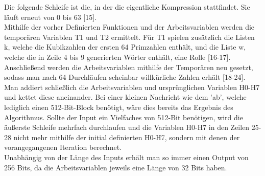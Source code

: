 Die folgende Schleife ist die, in der die eigentliche Kompression stattfindet. Sie läuft erneut von 0 bis 63 [15].\\
Mithilfe der vorher Definierten Funktionen und der Arbeitsvariablen werden die temporären Variablen T1 und T2 ermittelt. 
Für T1 spielen zusätzlich die Listen k, welche die Kubikzahlen der ersten 64 Primzahlen enthält, und die Liste w, welche die in Zeile 4 bis 9 generierten Wörter enthält, eine Rolle [16-17].\\
Anschließend werden die Arbeitsvariablen mithilfe der Temporären neu gesetzt, sodass man nach 64 Durchläufen scheinbar willkürliche Zahlen erhält [18-24].\\
Man addiert schließlich die Arbeitsvariablen und ursprünglichen Variablen H0-H7 und kettet diese aneinander. Bei einer kleinen Nachricht wie dem 'ab', welche lediglich einen 512-Bit-Block benötigt, wäre dies bereits das Ergebnis des Algorithmus. Sollte der Input ein Vielfaches von 512-Bit benötigen, wird die äußerste Schleife mehrfach durchlaufen und die Variablen H0-H7 in den Zeilen 25-28 nicht mehr mithilfe der initial definierten H0-H7, sondern mit denen der vorangegangenen Iteration berechnet.\\
Unabhängig von der Länge des Inputs erhält man so immer einen Output von 256 Bits, da die Arbeitsvariablen jeweils eine Länge von 32 Bits haben.

